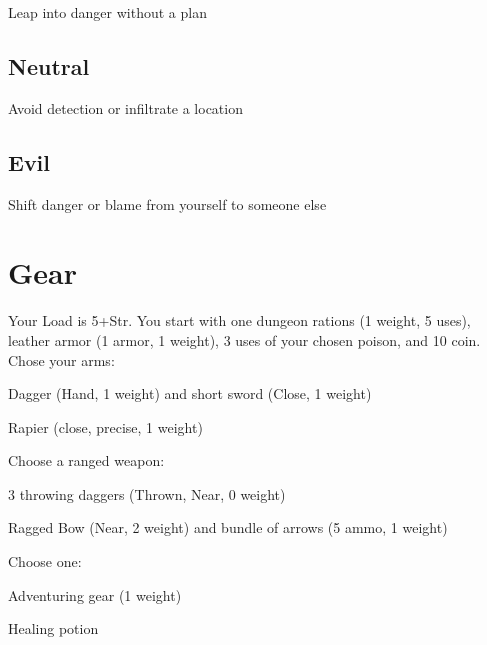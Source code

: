 Leap into danger without a plan

         
\subsection{Neutral}   
         

Avoid detection or infiltrate a location

         
\subsection{Evil}   
         

Shift danger or blame from yourself to someone else

       

       
\section{Gear}   
       

         

Your Load is 5+Str. You start with one dungeon rations (1 weight, 5 uses), leather armor (1 armor, 1 weight), 3 uses of your chosen poison, and 10 coin. Chose your arms:

         
\startitemize[1,packed]
           
\item Dagger (Hand, 1 weight) and short sword (Close, 1 weight)

           
\item Rapier (close, precise, 1 weight)

         
\stopitemize
         

Choose a ranged weapon:

         
\startitemize[1,packed]
           
\item 3 throwing daggers  (Thrown, Near, 0 weight)

           
\item Ragged Bow (Near, 2 weight) and bundle of arrows (5 ammo, 1 weight)

         
\stopitemize
         

Choose one:

         
\startitemize[1,packed]
           
\item Adventuring gear (1 weight)

           
\item Healing potion

